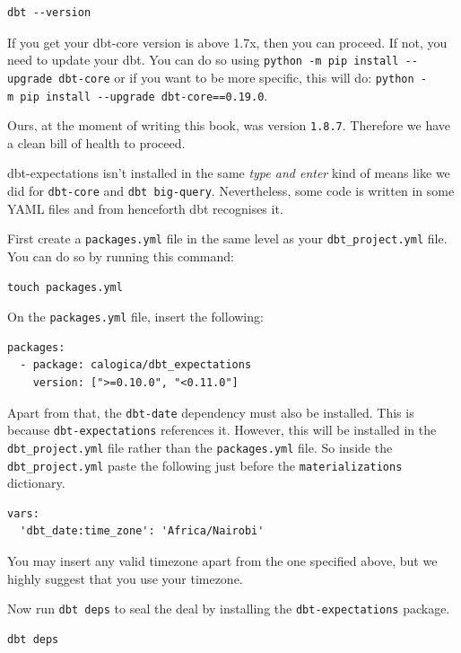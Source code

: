 \documentclass[
]{book}
\begin{document}
\begin{verbatim}
dbt --version
\end{verbatim}

If you get your dbt-core version is above 1.7x, then you can proceed. If not, you need to update your dbt. You can do so using \texttt{python\ -m\ pip\ install\ -\/-upgrade\ dbt-core} or if you want to be more specific, this will do: \texttt{python\ -m\ pip\ install\ -\/-upgrade\ dbt-core==0.19.0}.

Ours, at the moment of writing this book, was version \texttt{1.8.7}. Therefore we have a clean bill of health to proceed.

dbt-expectations isn't installed in the same \emph{type and enter} kind of means like we did for \texttt{dbt-core} and \texttt{dbt\ big-query}. Nevertheless, some code is written in some YAML files and from henceforth dbt recognises it.

First create a \texttt{packages.yml} file in the same level as your \texttt{dbt\_project.yml} file. You can do so by running this command:

\begin{verbatim}
touch packages.yml
\end{verbatim}

On the \texttt{packages.yml} file, insert the following:

\begin{verbatim}
packages:
  - package: calogica/dbt_expectations
    version: [">=0.10.0", "<0.11.0"]
\end{verbatim}

Apart from that, the \texttt{dbt-date} dependency must also be installed. This is because \texttt{dbt-expectations} references it. However, this will be installed in the \texttt{dbt\_project.yml} file rather than the \texttt{packages.yml} file. So inside the \texttt{dbt\_project.yml} paste the following just before the \texttt{materializations} dictionary.

\begin{verbatim}
vars:
  'dbt_date:time_zone': 'Africa/Nairobi'
\end{verbatim}

You may insert any valid timezone apart from the one specified above, but we highly suggest that you use your timezone.

Now run \texttt{dbt\ deps} to seal the deal by installing the \texttt{dbt-expectations} package.

\begin{verbatim}
dbt deps
\end{verbatim}
\end{document}

